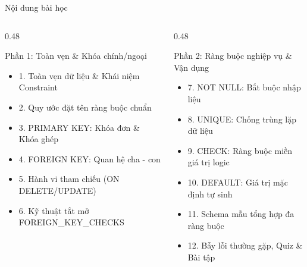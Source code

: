 \documentclass[aspectratio=169,11pt]{beamer}
\begin{document}
\begin{frame}{Nội dung bài học}
\begin{columns}[t]
  \begin{column}{0.48\textwidth}
    \begin{block}{Phần 1: Toàn vẹn \& Khóa chính/ngoại}
      \begin{itemize}\setlength{\itemsep}{1.5pt}
        \item 1. Toàn vẹn dữ liệu \& Khái niệm Constraint
        \item 2. Quy ước đặt tên ràng buộc chuẩn
        \item 3. PRIMARY KEY: Khóa đơn \& Khóa ghép
        \item 4. FOREIGN KEY: Quan hệ cha - con
        \item 5. Hành vi tham chiếu (ON DELETE/UPDATE)
        \item 6. Kỹ thuật tắt mở FOREIGN\_KEY\_CHECKS
      \end{itemize}
    \end{block}
  \end{column}
  \begin{column}{0.48\textwidth}
    \begin{block}{Phần 2: Ràng buộc nghiệp vụ \& Vận dụng}
      \begin{itemize}\setlength{\itemsep}{1.5pt}
        \item 7. NOT NULL: Bắt buộc nhập liệu
        \item 8. UNIQUE: Chống trùng lặp dữ liệu
        \item 9. CHECK: Ràng buộc miền giá trị logic
        \item 10. DEFAULT: Giá trị mặc định tự sinh
        \item 11. Schema mẫu tổng hợp đa ràng buộc
        \item 12. Bẫy lỗi thường gặp, Quiz \& Bài tập
      \end{itemize}
    \end{block}
  \end{column}
\end{columns}
\end{frame}

\end{document}
